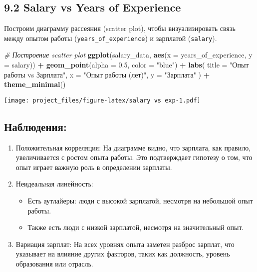 \documentclass[
]{article}
\newenvironment{Shaded}{\begin{snugshade}}{\end{snugshade}}
\newcommand{\AttributeTok}[1]{\textcolor[rgb]{0.13,0.29,0.53}{#1}}
\newcommand{\CommentTok}[1]{\textcolor[rgb]{0.56,0.35,0.01}{\textit{#1}}}
\newcommand{\FloatTok}[1]{\textcolor[rgb]{0.00,0.00,0.81}{#1}}
\newcommand{\FunctionTok}[1]{\textcolor[rgb]{0.13,0.29,0.53}{\textbf{#1}}}
\newcommand{\NormalTok}[1]{#1}
\newcommand{\SpecialCharTok}[1]{\textcolor[rgb]{0.81,0.36,0.00}{\textbf{#1}}}
\newcommand{\StringTok}[1]{\textcolor[rgb]{0.31,0.60,0.02}{#1}}
\providecommand{\tightlist}{%
  \setlength{\itemsep}{0pt}\setlength{\parskip}{0pt}}
\begin{document}
\subsection{9.2 Salary vs Years of
Experience}\label{salary-vs-years-of-experience}

Построим диаграмму рассеяния (scatter plot), чтобы визуализировать связь
между опытом работы (\texttt{years\_of\_experience}) и зарплатой
(\texttt{salary}).

\begin{Shaded}
\begin{Highlighting}[]
\CommentTok{\# Построение scatter plot}
\FunctionTok{ggplot}\NormalTok{(salary\_data, }\FunctionTok{aes}\NormalTok{(}\AttributeTok{x =}\NormalTok{ years\_of\_experience, }\AttributeTok{y =}\NormalTok{ salary)) }\SpecialCharTok{+}
  \FunctionTok{geom\_point}\NormalTok{(}\AttributeTok{alpha =} \FloatTok{0.5}\NormalTok{, }\AttributeTok{color =} \StringTok{"blue"}\NormalTok{) }\SpecialCharTok{+}
  \FunctionTok{labs}\NormalTok{(}
    \AttributeTok{title =} \StringTok{"Опыт работы vs Зарплата"}\NormalTok{,}
    \AttributeTok{x =} \StringTok{"Опыт работы (лет)"}\NormalTok{,}
    \AttributeTok{y =} \StringTok{"Зарплата"}
\NormalTok{  ) }\SpecialCharTok{+}
  \FunctionTok{theme\_minimal}\NormalTok{()}
\end{Highlighting}
\end{Shaded}

\texttt{[image: project\_files/figure-latex/salary vs exp-1.pdf]}

\subsection{Наблюдения:}\label{ux43dux430ux431ux43bux44eux434ux435ux43dux438ux44f-7}

\begin{enumerate}
\def\labelenumi{\arabic{enumi}.}
\tightlist
\item
  Положительная корреляция: На диаграмме видно, что зарплата, как
  правило, увеличивается с ростом опыта работы. Это подтверждает
  гипотезу о том, что опыт играет важную роль в определении зарплаты.
\item
  Неидеальная линейность:

  \begin{itemize}
  \tightlist
  \item
    Есть аутлайеры: люди с высокой зарплатой, несмотря на небольшой опыт
    работы.
  \item
    Также есть люди с низкой зарплатой, несмотря на значительный опыт.
  \end{itemize}
\item
  Вариация зарплат: На всех уровнях опыта заметен разброс зарплат, что
  указывает на влияние других факторов, таких как должность, уровень
  образования или отрасль.
\end{enumerate}
\end{document}
